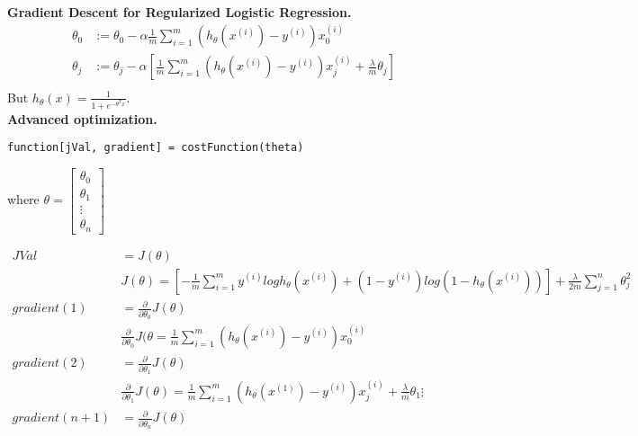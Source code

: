 \documentclass[a4 paper, 11 pt]{article}
\begin{document}
\textbf{Gradient Descent for Regularized Logistic Regression.} 
\begin{align*}
\theta_0 &:= \theta_0 - \alpha\frac{1}{m}\sum_{i=1}^m (h_\theta(x^{(i)}) - y^{(i)})x_0^{(i)} \\
\theta_j &:= \theta_j - \alpha \left[ \frac{1}{m}\sum_{i=1}^m (h_\theta(x^{(i)}) - y^{(i)})x_j^{(i)} + \frac{\lambda}{m}\theta_j\right]\\
\end{align*}
But $h_\theta(x) = \frac{1}{1 + e^{-\theta^Tx}}$.\\

\textbf{Advanced optimization.}
\begin{lstlisting}
function[jVal, gradient] = costFunction(theta)
\end{lstlisting}
where $\theta = \begin{bmatrix}\theta_0 \\ \theta_1 \\ \vdots \\ \theta_n \end{bmatrix}$

\begin{align*}
JVal &= J(\theta) \\
& J(\theta) = \left[-\frac{1}{m}\sum_{i=1}^m y^{(i)} log h_\theta(x^{(i)}) + (1 - y^{(i)}) log (1 - h_\theta(x^{(i)})) \right] + \frac{\lambda}{2m} \sum_{j=1}^n \theta_j^2 \\
gradient(1) &= \frac{\partial}{\partial\theta_0}J(\theta) \\
& \frac{\partial}{\partial\theta_0}J(\theta = \frac{1}{m}\sum_{i=1}^m(h_\theta(x^{(i)}) - y^{(i)})x_0^{(i)} \\
gradient(2) &= \frac{\partial}{\partial\theta_1}J(\theta) \\
& \frac{\partial}{\partial\theta_1}J(\theta) = \frac{1}{m}\sum_{i=1}^m (h_\theta(x^{(1)}) - y^{(i)})x_j^{(i)} + \frac{\lambda}{m}\theta_1
\vdots & \\
gradient(n+1) &= \frac{\partial}{\partial\theta_n}J(\theta)
\end{align*}
\end{document}
